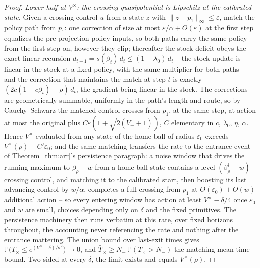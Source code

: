 \documentclass[11pt]{article}
\theoremstyle{definition}
\theoremstyle{remark}
\numberwithin{equation}{section}
\begin{document}
\begin{proof}
\emph{Lower half at $V^{\times}$: the crossing quasipotential is Lipschitz at the calibrated state.} Given a crossing control $u$ from a state $z$ with $\|z - p_1\|_\infty \le \varepsilon$, match the policy path from $p_1$: one correction of size at most $\varepsilon/\alpha + O(\varepsilon)$ at the first step equalizes the pre-projection policy inputs, so both paths carry the same policy from the first step on, however they clip; thereafter the stock deficit obeys the exact linear recursion $d_{t+1} = s(\beta_t)\,d_t \le (1-\lambda_0)\,d_t$ -- the stock update is linear in the stock at a fixed policy, with the same multiplier for both paths -- and the correction that maintains the match at step $t$ is exactly $(2c(1-c\beta_t)-\rho)\,d_t$, the gradient being linear in the stock. The corrections are geometrically summable, uniformly in the path's length and route, so by Cauchy--Schwarz the matched control crosses from $p_1$, at the same step, at action at most the original plus $C\varepsilon(1 + \sqrt{2(V_+ + 1)})$, $C$ elementary in $c$, $\lambda_0$, $\eta$, $\alpha$. Hence $V^{\times}$ evaluated from any state of the home ball of radius $\varepsilon_0$ exceeds $V^{\times}(\rho) - C'\varepsilon_0$; and the same matching transfers the rate to the entrance event of Theorem~\ref{thm:arr}'s persistence paragraph: a noise window that drives the running maximum to $\beta^\dagger_\rho - w$ from a home-ball state contains a level-$(\beta^\dagger_\rho - w)$ crossing control, and matching it to the calibrated start, then boosting its last advancing control by $w/\alpha$, completes a full crossing from $p_1$ at $O(\varepsilon_0) + O(w)$ additional action -- so every entering window has action at least $V^{\times} - \delta/4$ once $\varepsilon_0$ and $w$ are small, choices depending only on $\delta$ and the fixed primitives. The persistence machinery then runs verbatim at this rate, over fixed horizons throughout, the accounting never referencing the rate and nothing after the entrance mattering. The union bound over last-exit times gives $\mathbb{P}\bigl(T_{\times} \le e^{(V^{\times}-\delta)/\sigma^2}\bigr) \to 0$, and $\bar T_{\times} \ge N_-\,\mathbb{P}(T_{\times} > N_-)$ the matching mean-time bound. Two-sided at every $\delta$, the limit exists and equals $V^{\times}(\rho)$.
\end{proof}
\end{document}

